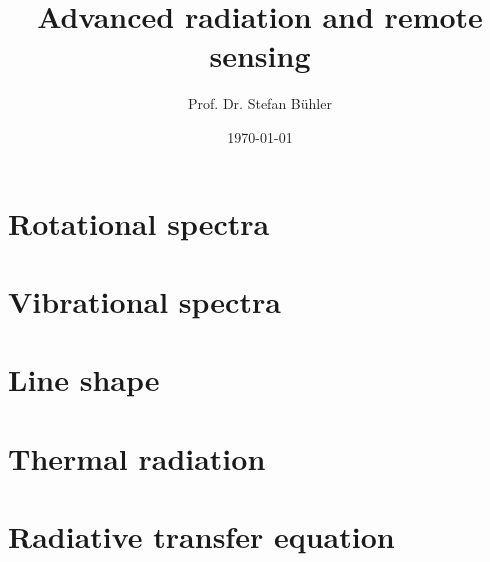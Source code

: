 \documentclass[a4paper,fleqn]{article}
\title{Advanced radiation and remote sensing}
\author{Prof. Dr. Stefan Bühler}
\date{\today}
\begin{document}
\maketitle
\thispagestyle{empty}\pagestyle{empty}
\tableofcontents
\newpage\pagestyle{fancy}

\section{Rotational spectra}

\section{Vibrational spectra}

\section{Line shape}

\section{Thermal radiation}

\section{Radiative transfer equation}
\end{document}
